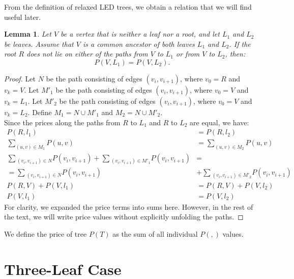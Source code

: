 \documentclass[openany]{book}
\newcommand{\Price}[2]{P(#1,#2)}
\newcommand{\Ptotal}[1]{P(#1)}
\newtheorem{lemma}{Lemma}
\begin{document}
	From the definition of relaxed LED trees, we obtain a relation that we will find useful later.
	\begin{lemma}\label{lem:led}
		Let \( V \) be a vertex that is neither a leaf nor a root, and let \( L_1 \) and \( L_2 \) be leaves. Assume that \( V \) is a common ancestor of both leaves \( L_1 \) and \( L_2 \).
		If the root \( R \) does not lie on either of the paths from \( V \) to \( L_1 \) or from \( V \) to \( L_2 \), then:
		\[
		\Price{V}{L_1} = \Price{V}{L_2}.
		\]			
	\end{lemma}
	\begin{proof}
		Let \(N\) be the path consisting of edges \((v_i, v_{i+1})\), where \(v_0 = R\) and \(v_k = V\).
		Let \(M'_1\) be the path consisting of edges \((v_i, v_{i+1})\), where \(v_0 = V\) and \(v_k = L_1\).
		Let \(M'_2\) be the path consisting of edges \((v_i, v_{i+1})\), where \(v_0 = V\) and \( v_k = L_2\).
		Define \( M_1 = N \cup M'_1 \) and \( M_2 = N \cup M'_2 \).\\
		Since the prices along the paths from \( R \) to \( L_1 \) and \( R \) to \( L_2 \) are equal, we have:
		\begin{align*}
			\Price{R}{l_1} &= \Price{R}{l_2}\\
			\sum_{(u,v) \in M_1} \Price{u}{v} &= \sum_{(u,v) \in M_2} \Price{u}{v}\\
			\sum\!_{(v_i,v_{i+1}) \in N}\Price{v_i}{v_{i+1}} +\sum\!_{(v_i,v_{i+1}) \in M'_1}\Price{v_i}{v_{i+1}} 
			&=\\=\sum\!_{(v_i,v_{i+1}) \in N}\Price{v_i}{v_{i+1}}& +\sum\!_{(v_i,v_{i+1}) \in M'_2}\Price{v_i}{v_{i+1}}\\
			\Price{R}{V} + \Price{V}{l_1} &= \Price{R}{V} + \Price{V}{l_2} \\
			\Price{V}{l_1} &= \Price{V}{l_2}
		\end{align*}
		For clarity, we expanded the price terms into sums here.  
		However, in the rest of the text, we will write price values without explicitly unfolding the paths.
	\end{proof}
	
	We define the price of tree \(\Ptotal{T}\) as the sum of all individual \(\Price{}{}\) values.

	
	\chapter{Three-Leaf Case}
	
\end{document}
